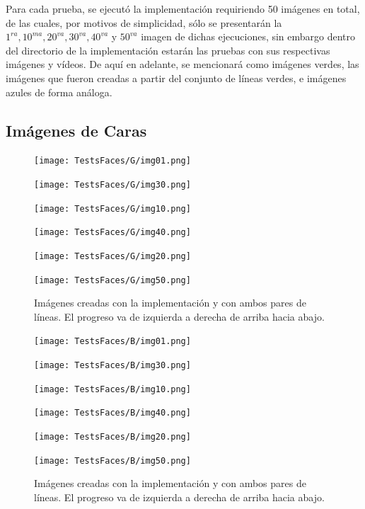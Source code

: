 \documentclass[conference]{IEEEtran}
\begin{document}
	Para cada prueba, se ejecutó la implementación requiriendo 50 imágenes en total, de las cuales, por motivos de simplicidad, sólo se presentarán la $1^{ra}, 10^{ma}, 20^{va}, 30^{va}, 40^{va}$ y $50^{va}$ imagen de dichas ejecuciones, sin embargo dentro del directorio de la implementación estarán las pruebas con sus respectivas imágenes y vídeos.
	De aquí en adelante, se mencionará como imágenes verdes, las imágenes que fueron creadas a partir del conjunto de líneas verdes, e imágenes azules de forma análoga. 


	\subsection*{Imágenes de Caras}
\begin{figure}[H]
\begin{multicols}{3}
    \centering
    \texttt{[image: TestsFaces/G/img01.png]} \par
    \texttt{[image: TestsFaces/G/img30.png]} \par
    
    \texttt{[image: TestsFaces/G/img10.png]} \par
    \texttt{[image: TestsFaces/G/img40.png]} \par

    \texttt{[image: TestsFaces/G/img20.png]} \par
    \texttt{[image: TestsFaces/G/img50.png]} \par
\end{multicols}
\caption{Imágenes creadas con la implementación y con ambos pares de líneas. El progreso va de izquierda a derecha de arriba hacia abajo.}
\end{figure}


\begin{figure}[H]
\begin{multicols}{3}
    \centering
    \texttt{[image: TestsFaces/B/img01.png]} \par
    \texttt{[image: TestsFaces/B/img30.png]} \par
    
    \texttt{[image: TestsFaces/B/img10.png]} \par
    \texttt{[image: TestsFaces/B/img40.png]} \par

    \texttt{[image: TestsFaces/B/img20.png]} \par
    \texttt{[image: TestsFaces/B/img50.png]} \par
\end{multicols}
\caption{Imágenes creadas con la implementación y con ambos pares de líneas. El progreso va de izquierda a derecha de arriba hacia abajo.}
\end{figure}
\end{document}
